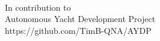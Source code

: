 \begin{titlepage}
\vspace*{7cm}
\begin{center}
{\Huge \userTitle } \\
\vspace*{1cm}
{\Large In contribution to} \\
{\Large Autonomous Yacht Development Project} \\
{\small https://github.com/TimB-QNA/AYDP} \\
\vspace*{1cm}
\userAuthor \\
\vspace*{0.5cm}
{\small \userDate}\\
\end{center}
\end{titlepage}